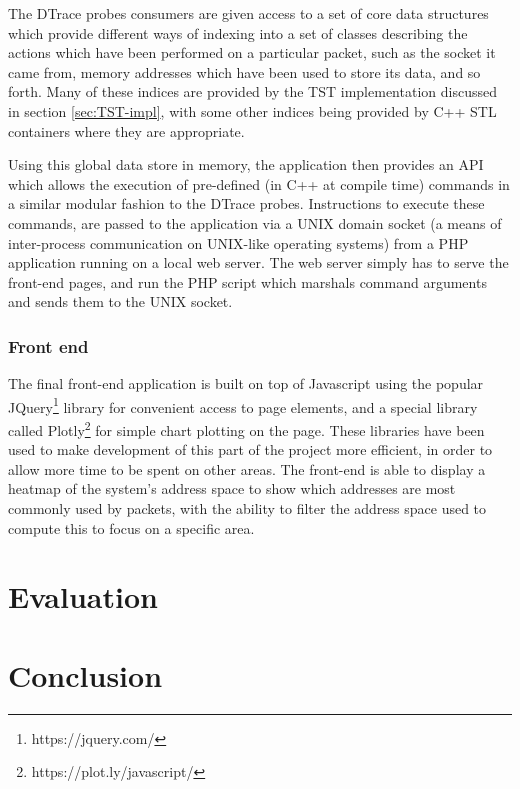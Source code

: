 \documentclass[a4paper,12pt,twoside,openright]{report}
\begin{document}
	The DTrace probes consumers are given access to a set of core data structures which provide different ways of indexing into a set of classes describing the actions which have been performed on a particular packet, such as the socket it came from, memory addresses which have been used to store its data, and so forth. Many of these indices are provided by the TST implementation discussed in section \ref{sec:TST-impl}, with some other indices being provided by C++ STL containers where they are appropriate.
	
	Using this global data store in memory, the application then provides an API which allows the execution of pre-defined (in C++ at compile time) commands in a similar modular fashion to the DTrace probes. Instructions to execute these commands, are passed to the application via a UNIX domain socket (a means of inter-process communication on UNIX-like operating systems) from a PHP application running on a local web server. The web server simply has to serve the front-end pages, and run the PHP script which marshals command arguments and sends them to the UNIX socket.
	
	\subsection{Front end}
	
	The final front-end application is built on top of Javascript using the popular JQuery\footnote{https://jquery.com/} library for convenient access to page elements, and a special library called Plotly\footnote{https://plot.ly/javascript/} for simple chart plotting on the page. These libraries have been used to make development of this part of the project more efficient, in order to allow more time to be spent on other areas. The front-end is able to display a heatmap of the system's address space to show which addresses are most commonly used by packets, with the ability to filter the address space used to compute this to focus on a specific area.
	
	
	\chapter{Evaluation}
	
	
	\chapter{Conclusion}
	
	
	
	
	
	
\end{document}
